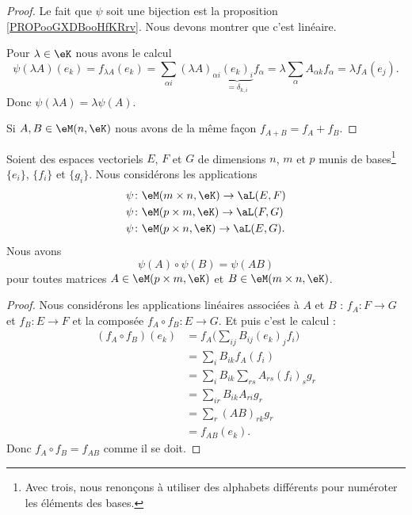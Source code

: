 \begin{proof}
	Le fait que \( \psi\) soit une bijection est la proposition \ref{PROPooGXDBooHfKRrv}. Nous devons montrer que c'est linéaire.

	Pour \( \lambda\in \eK\) nous avons le calcul
	\begin{equation}
		\psi(\lambda A)(e_k)=f_{\lambda A}(e_k)=\sum_{\alpha i}(\lambda A)_{\alpha i}\underbrace{(e_k)_i}_{=\delta_{k,i}}f_{\alpha}=\lambda\sum_{\alpha}A_{\alpha k}f_{\alpha}=\lambda f_A(e_j).
	\end{equation}
	Donc \( \psi(\lambda A)=\lambda\psi(A)\).

	Si \( A,B\in \eM(n,\eK)\) nous avons de la même façon \( f_{A+B}=f_A+f_B\).
\end{proof}

\begin{proposition}     \label{PROPooCSJNooEqcmFm}
	Soient des espaces vectoriels \( E\), \( F\) et \( G\) de dimensions \( n\), \( m\) et \( p\) munis de bases\footnote{Avec trois, nous renonçons à utiliser des alphabets différents pour numéroter les éléments des bases.} \( \{ e_i \}\), \( \{ f_i \}\) et \( \{ g_i \}\). Nous considérons les applications
	\begin{subequations}
		\begin{align}
			\psi & \colon \eM(m\times n,\eK)\to \aL(E,F)  \\
			\psi & \colon \eM(p\times m,\eK)\to \aL(F,G)  \\
			\psi & \colon \eM(p\times n,\eK)\to \aL(E,G).
		\end{align}
	\end{subequations}
	Nous avons
	\begin{equation}
		\psi(A)\circ \psi(B)=\psi(AB)
	\end{equation}
	pour toutes matrices \( A\in \eM(p\times m,\eK)\) et \( B\in \eM(m\times n,\eK)\).
\end{proposition}

\begin{proof}
	Nous considérons les applications linéaires associées à \( A\) et \( B\) : \( f_A\colon F\to G\) et \( f_B\colon E\to F\) et la composée \( f_A\circ f_B\colon E\to G\). Et puis c'est le calcul :
	\begin{subequations}
		\begin{align}
			(f_A\circ f_B)(e_k) & =f_A\big( \sum_{ij}B_{ij}(e_k)_jf_i \big) \\
			                    & =\sum_i B_{ik}f_A(f_i)                    \\
			                    & =\sum_iB_{ik}\sum_{rs}A_{rs}(f_i)_sg_r    \\
			                    & =\sum_{ir}B_{ik}A_{ri}g_r                 \\
			                    & =\sum_r(AB)_{rk}g_r                       \\
			                    & =f_{AB}(e_k).
		\end{align}
	\end{subequations}
	Donc \( f_A\circ f_B=f_{AB}\) comme il se doit.
\end{proof}

